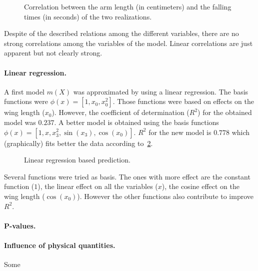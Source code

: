 \begin{figure}
  \centering
  
  \caption{Correlation between the arm length (in centimeters) and the falling
  times (in seconds) of the two realizations.}
  \label{fig_al_times}
\end{figure}

Despite of the described relations among the different variables, there are no
strong correlations among the variables of the model. Linear correlations are
just apparent but not clearly strong.

\paragraph{Linear regression.} A first model $m(X)$ was approximated by using a
linear regression. The basis functions were $\phi(x) = [1, x_0, x_0^2]$. Those
functions were based on effects on the wing length ($x_0$). However, the
coefficient of determination ($R^2$) for the obtained model was $0.237$. A
better model is obtained using the basis functions $\phi(x) = [1, x, x_3^2,
\sin(x_3), \cos(x_0)]$. $R^2$  for the new model is $0.778$ which (graphically)
fits better the data according to~\cref{fig_goodlr}.
\begin{figure}
  \centering
  
  \caption{Linear regression based prediction.}
  \label{fig_goodlr}
\end{figure}

\begin{comment}
  \begin{figure}
    \centering
    
    \caption{Comparison between the times measured in the two realizations.}
    \label{fig_badlr}
  \end{figure}
\end{comment}
Several functions were tried as basis. The ones with more effect are the
constant function ($1$), the linear effect on all the variables ($x$), the
cosine effect on the wing length ($\cos(x_0)$). However the other functions also
contribute to improve $R^2$.

\paragraph{P-values.}

\paragraph{Influence of physical quantities.}
Some


